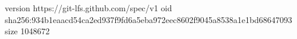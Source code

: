 version https://git-lfs.github.com/spec/v1
oid sha256:934b1eaacd54ca2ed937f9fd6a5eba972eec8602f9045a8538a1e1bd68647093
size 1048672
